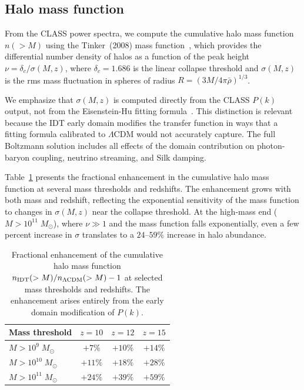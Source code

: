 \documentclass[aps,prd,twocolumn,superscriptaddress,nofootinbib]{revtex4-2}
\begin{document}
\subsection{Halo mass function}
\label{sec:hmf}

From the CLASS power spectra, we compute the cumulative halo mass
function $n(>M)$ using the Tinker~(2008) mass
function~\cite{Tinker2008}, which provides the differential number
density of halos as a function of the peak height
$\nu = \delta_c/\sigma(M,z)$, where $\delta_c = 1.686$ is the
linear collapse threshold and $\sigma(M,z)$ is the rms mass
fluctuation in spheres of radius $R = (3M/4\pi\bar{\rho})^{1/3}$.

We emphasize that $\sigma(M,z)$ is computed directly from the CLASS
$P(k)$ output, not from the Eisenstein-Hu fitting
formula~\cite{Efstathiou2019}. This distinction is relevant because
the IDT early domain modifies the transfer function in ways that a
fitting formula calibrated to $\Lambda$CDM would not accurately
capture. The full Boltzmann solution includes all effects of the
domain contribution on photon-baryon coupling, neutrino streaming,
and Silk damping.

Table~\ref{tab:hmf} presents the fractional enhancement in the
cumulative halo mass function at several mass thresholds and
redshifts. The enhancement grows with both mass and redshift,
reflecting the exponential sensitivity of the mass function to
changes in $\sigma(M,z)$ near the collapse threshold. At the
high-mass end ($M > 10^{11}\;M_\odot$), where $\nu \gg 1$ and the
mass function falls exponentially, even a few percent increase in
$\sigma$ translates to a $24$--$59\%$ increase in halo abundance.

\begin{table}[h]
\centering
\caption{Fractional enhancement of the cumulative halo mass function
$n_{\rm IDT}(>M)/n_{\rm \Lambda CDM}(>M) - 1$ at selected mass
thresholds and redshifts. The enhancement arises entirely from the
early domain modification of $P(k)$.}
\label{tab:hmf}
\begin{tabular}{lccc}
\hline\hline
Mass threshold & $z = 10$ & $z = 12$ & $z = 15$ \\
\hline
$M > 10^{9}\;M_\odot$  & $+7\%$  & $+10\%$ & $+14\%$ \\
$M > 10^{10}\;M_\odot$ & $+11\%$ & $+18\%$ & $+28\%$ \\
$M > 10^{11}\;M_\odot$ & $+24\%$ & $+39\%$ & $+59\%$ \\
\hline\hline
\end{tabular}
\end{table}
\end{document}
